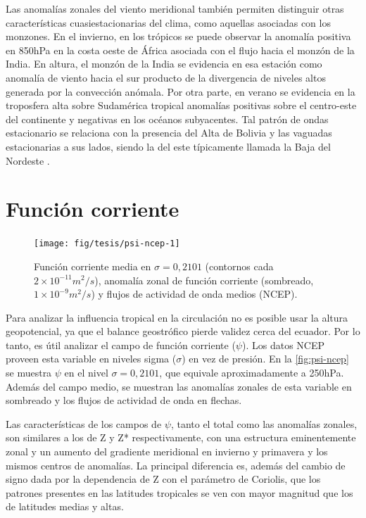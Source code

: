 \documentclass[spanish,a4paper,12pt,oneside]{book}
\begin{document}
Las anomalías zonales del viento meridional también permiten distinguir
otras características cuasiestacionarias del clima, como aquellas
asociadas con los monzones. En el invierno, en los trópicos se puede
observar la anomalía positiva en 850hPa en la costa oeste de África
asociada con el flujo hacia el monzón de la India. En altura, el monzón
de la India se evidencia en esa estación como anomalía de viento hacia
el sur producto de la divergencia de niveles altos generada por la
convección anómala. Por otra parte, en verano se evidencia en la
troposfera alta sobre Sudamérica tropical anomalías positivas sobre el
centro-este del continente y negativas en los océanos subyacentes. Tal
patrón de ondas estacionario se relaciona con la presencia del Alta de
Bolivia y las vaguadas estacionarias a sus lados, siendo la del este
típicamente llamada la Baja del Nordeste \citep{Vera2006}.

\hypertarget{funcion-corriente}{%
\section{Función corriente}\label{funcion-corriente}}

\begin{landscape}\begin{figure}

{\centering \texttt{[image: fig/tesis/psi-ncep-1]} 

}

\caption{Función corriente media en $\sigma = 0,2101$ (contornos cada $2\times10^{-11}m^2/s$), anomalía zonal de función corriente (sombreado,  $1\times10^{-9}m^2/s$) y flujos de actividad de onda medios (NCEP).}\label{fig:psi-ncep}
\end{figure}
\end{landscape}

Para analizar la influencia tropical en la circulación no es posible
usar la altura geopotencial, ya que el balance geostrófico pierde
validez cerca del ecuador. Por lo tanto, es útil analizar el campo de
función corriente (\(\psi\)). Los datos NCEP proveen esta variable en
niveles sigma (\(\sigma\)) en vez de presión. En la
\autoref{fig:psi-ncep} se muestra \(\psi\) en el nivel
\(\sigma = 0,2101\), que equivale aproximadamente a 250hPa. Además del
campo medio, se muestran las anomalías zonales de esta variable en
sombreado y los flujos de actividad de onda en flechas.

Las características de los campos de \(\psi\), tanto el total como las
anomalías zonales, son similares a los de Z y Z* respectivamente, con
una estructura eminentemente zonal y un aumento del gradiente meridional
en invierno y primavera y los mismos centros de anomalías. La principal
diferencia es, además del cambio de signo dada por la dependencia de Z
con el parámetro de Coriolis, que los patrones presentes en las
latitudes tropicales se ven con mayor magnitud que los de latitudes
medias y altas.
\end{document}
